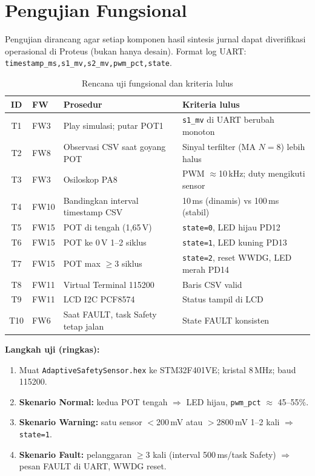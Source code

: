 \documentclass[12pt,a4paper]{article}
\begin{document}
\section{Pengujian Fungsional}
Pengujian dirancang agar setiap komponen hasil sintesis jurnal dapat diverifikasi operasional di Proteus (bukan hanya desain). Format log UART: \texttt{timestamp\_ms,s1\_mv,s2\_mv,pwm\_pct,state}.

\begin{table}[H]
\centering
\caption{Rencana uji fungsional dan kriteria lulus}\label{tab:uji}
\small
\begin{tabular}{@{}clp{3.5cm}p{4.5cm}@{}}
\toprule
\textbf{ID} & \textbf{FW} & \textbf{Prosedur} & \textbf{Kriteria lulus} \\
\midrule
T1 & FW3 & Play simulasi; putar POT1 & \texttt{s1\_mv} di UART berubah monoton \\
T2 & FW8 & Observasi CSV saat goyang POT & Sinyal terfilter (MA $N{=}8$) lebih halus \\
T3 & FW3 & Osiloskop PA8 & PWM $\approx$10\,kHz; duty mengikuti sensor \\
T4 & FW10 & Bandingkan interval timestamp CSV & 10\,ms (dinamis) vs 100\,ms (stabil) \\
T5 & FW15 & POT di tengah (1,65\,V) & \texttt{state=0}, LED hijau PD12 \\
T6 & FW15 & POT ke 0\,V 1--2 siklus & \texttt{state=1}, LED kuning PD13 \\
T7 & FW15 & POT max $\geq$3 siklus & \texttt{state=2}, reset WWDG, LED merah PD14 \\
T8 & FW11 & Virtual Terminal 115200 & Baris CSV valid \\
T9 & FW11 & LCD I2C PCF8574 & Status tampil di LCD \\
T10 & FW6 & Saat FAULT, task Safety tetap jalan & State FAULT konsisten \\
\bottomrule
\end{tabular}
\end{table}

\textbf{Langkah uji (ringkas):}
\begin{enumerate}
    \item Muat \texttt{AdaptiveSafetySensor.hex} ke STM32F401VE; kristal 8\,MHz; baud 115200.
    \item \textbf{Skenario Normal:} kedua POT tengah $\Rightarrow$ LED hijau, \texttt{pwm\_pct} $\approx$ 45--55\%.
    \item \textbf{Skenario Warning:} satu sensor $<$200\,mV atau $>$2800\,mV 1--2 kali $\Rightarrow$ \texttt{state=1}.
    \item \textbf{Skenario Fault:} pelanggaran $\geq$3 kali (interval 500\,ms/task Safety) $\Rightarrow$ pesan FAULT di UART, WWDG reset.
\end{enumerate}
\end{document}
